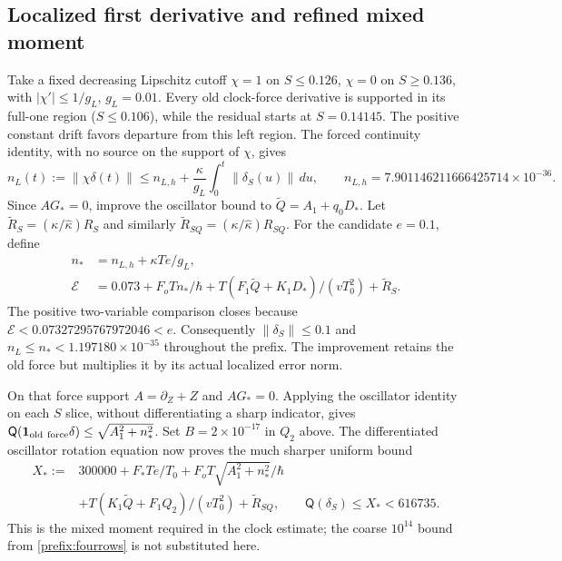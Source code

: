 \documentclass[11pt]{article}
\theoremstyle{definition}\newtheorem{definition}[theorem]{Definition}
\theoremstyle{remark}\newtheorem{remark}[theorem]{Remark}
\begin{document}
\subsection{Localized first derivative and refined mixed moment}
\label{prefix:localized}
Take a fixed decreasing Lipschitz cutoff $\chi=1$ on $S\le0.126$,
$\chi=0$ on $S\ge0.136$, with $|\chi'|\le1/g_L$, $g_L=0.01$.
Every old clock-force derivative is supported in its full-one region
($S\le0.106$), while the residual starts at $S=0.14145$.
The positive constant drift favors departure from this left region.
The forced continuity identity, with no source on the support of $\chi$,
gives
\begin{equation}
 n_L(t):=\|\chi\delta(t)\|
 \le n_{L,h}+\frac\kappa{g_L}\int_0^t\|\delta_S(u)\|\,du,
 \qquad n_{L,h}=7.901146211666425714\times10^{-36}.
 \label{prefix:left}
\end{equation}
Since $AG_*=0$, improve the oscillator bound to
$\widetilde Q=A_1+q_0D_*$.
Let $\widetilde R_S=(\kappa/\widehat\kappa)R_S$ and similarly
$\widetilde R_{SQ}=(\kappa/\widehat\kappa)R_{SQ}$.
For the candidate $e=0.1$, define
\begin{align}
 n_*&=n_{L,h}+\kappa Te/g_L,\nonumber\\
 \mathcal E&=0.073+F_oTn_*/\hbar
                  +T(F_1\widetilde Q+K_1D_*)/(vT_0^2)
                  +\widetilde R_S.
 \label{prefix:localfirst}
\end{align}
The positive two-variable comparison closes because
$\mathcal E<0.07327295767972046<e$.
Consequently $\|\delta_S\|\le0.1$ and $n_L\le n_*<1.197180\times10^{-35}$
throughout the prefix.  The improvement retains the old force but
multiplies it by its actual localized error norm.

On that force support $A=\partial_Z+Z$ and $AG_*=0$.  Applying the
oscillator identity on each $S$ slice, without differentiating a sharp
indicator, gives
$\mathsf Q(\mathbf1_{\rm old\ force}\delta)
 \le\sqrt{A_1^2+n_*^2}$.
Set $B=2\times10^{-17}$ in $Q_2$ above.  The differentiated oscillator
rotation equation now proves the much sharper uniform bound
\begin{align}
 X_*:={}&300000+F_*Te/T_0
 +F_oT\sqrt{A_1^2+n_*^2}/\hbar\nonumber\\
 &+T(K_1\widetilde Q+F_1Q_2)/(vT_0^2)
                    +\widetilde R_{SQ},
 \qquad\mathsf Q(\delta_S)\le X_*<616735.
 \label{prefix:refinedQ}
\end{align}
This is the mixed moment required in the clock estimate; the coarse
$10^{14}$ bound from \eqref{prefix:fourrows} is not substituted here.
\end{document}
